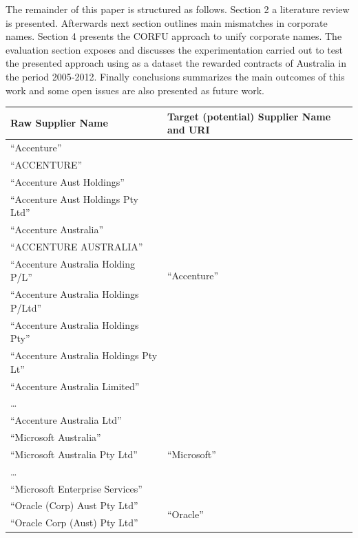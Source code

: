 \documentclass{llncs}
\begin{document}
The remainder of this paper is structured as follows. Section 2 a literature review is presented. Afterwards next section outlines main mismatches in corporate names. Section 4 presents 
the CORFU approach to unify corporate names. The evaluation section exposes and discusses the experimentation carried out to test the presented approach using as a dataset the rewarded 
contracts of Australia in the period 2005-2012. Finally conclusions summarizes the main outcomes of this work 
and some open issues are also presented as future work.



\begin{table}[!htb]
\renewcommand{\arraystretch}{1.3}
\begin{center}
\begin{tabular}{|p{7cm}|p{7cm}|}
\hline
  \textbf{Raw Supplier Name} & \textbf{Target (potential) Supplier Name and URI}  \\  \hline
  ``Accenture'' & \multirow{12}{*}{``Accenture''} \\
  ``ACCENTURE'' & \multirow{12}{*}{\scriptsize\url{http://live.dbpedia.org/resource/Accenture}} \\ 
  ``Accenture Aust Holdings'' & \\  
  ``Accenture Aust Holdings Pty Ltd'' & \\
  ``Accenture Australia'' & \\
  ``ACCENTURE AUSTRALIA'' & \\
  ``Accenture  Australia Holding P/L'' & \\
  ``Accenture Australia Holdings P/Ltd'' & \\
  ``Accenture Australia Holdings Pty'' & \\
  ``Accenture Australia Holdings Pty Lt''  & \\  
  ``Accenture Australia Limited'' & \\
  \ldots  & \\
  ``Accenture Australia Ltd'' & \\ \hline
  ``Microsoft Australia'' & \multirow{3}{*}{``Microsoft''} \\
  ``Microsoft Australia Pty Ltd'' & \multirow{3}{*}{\scriptsize\url{http://live.dbpedia.org/resource/Microsoft}} \\
  \ldots  & \\
  ``Microsoft Enterprise Services'' & \\ \hline
  ``Oracle (Corp) Aust Pty Ltd''  & \multirow{14}{*}{``Oracle''} \\
  ``Oracle Corp (Aust) Pty Ltd''  & \multirow{14}{*}{\scriptsize\url{http://live.dbpedia.org/resource/Oracle_Corporation}} \\

\end{tabular}
\end{center}
\end{table}
\end{document}
